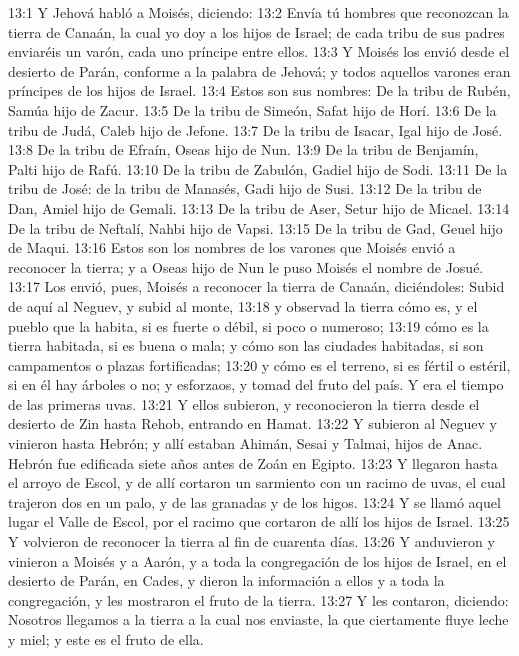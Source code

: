 13:1 Y Jehová habló a Moisés, diciendo:  
13:2 Envía tú hombres que reconozcan la tierra de Canaán, la cual yo doy a los hijos de Israel; de cada tribu de sus padres enviaréis un varón, cada uno príncipe entre ellos.  
13:3 Y Moisés los envió desde el desierto de Parán, conforme a la palabra de Jehová; y todos aquellos varones eran príncipes de los hijos de Israel.  
13:4 Estos son sus nombres: De la tribu de Rubén, Samúa hijo de Zacur.  
13:5 De la tribu de Simeón, Safat hijo de Horí.  
13:6 De la tribu de Judá, Caleb hijo de Jefone.  
13:7 De la tribu de Isacar, Igal hijo de José.  
13:8 De la tribu de Efraín, Oseas hijo de Nun.  
13:9 De la tribu de Benjamín, Palti hijo de Rafú.  
13:10 De la tribu de Zabulón, Gadiel hijo de Sodi.  
13:11 De la tribu de José: de la tribu de Manasés, Gadi hijo de Susi.  
13:12 De la tribu de Dan, Amiel hijo de Gemali.  
13:13 De la tribu de Aser, Setur hijo de Micael.  
13:14 De la tribu de Neftalí, Nahbi hijo de Vapsi. 
13:15 De la tribu de Gad, Geuel hijo de Maqui.  
13:16 Estos son los nombres de los varones que Moisés envió a reconocer la tierra; y a Oseas hijo de Nun le puso Moisés el nombre de Josué.  
13:17 Los envió, pues, Moisés a reconocer la tierra de Canaán, diciéndoles: Subid de aquí al Neguev, y subid al monte,  
13:18 y observad la tierra cómo es, y el pueblo que la habita, si es fuerte o débil, si poco o numeroso;  
13:19 cómo es la tierra habitada, si es buena o mala; y cómo son las ciudades habitadas, si son campamentos o plazas fortificadas;  
13:20 y cómo es el terreno, si es fértil o estéril, si en él hay árboles o no; y esforzaos, y tomad del fruto del país. Y era el tiempo de las primeras uvas.  
13:21 Y ellos subieron, y reconocieron la tierra desde el desierto de Zin hasta Rehob, entrando en Hamat.  
13:22 Y subieron al Neguev y vinieron hasta Hebrón; y allí estaban Ahimán, Sesai y Talmai, hijos de Anac. Hebrón fue edificada siete años antes de Zoán en Egipto.  
13:23 Y llegaron hasta el arroyo de Escol, y de allí cortaron un sarmiento con un racimo de uvas, el cual trajeron dos en un palo, y de las granadas y de los higos.  
13:24 Y se llamó aquel lugar el Valle de Escol, por el racimo que cortaron de allí los hijos de Israel.  
13:25 Y volvieron de reconocer la tierra al fin de cuarenta días.  
13:26 Y anduvieron y vinieron a Moisés y a Aarón, y a toda la congregación de los hijos de Israel, en el desierto de Parán, en Cades, y dieron la información a ellos y a toda la congregación, y les mostraron el fruto de la tierra.  
13:27 Y les contaron, diciendo: Nosotros llegamos a la tierra a la cual nos enviaste, la que ciertamente fluye leche y miel; y este es el fruto de ella.  
